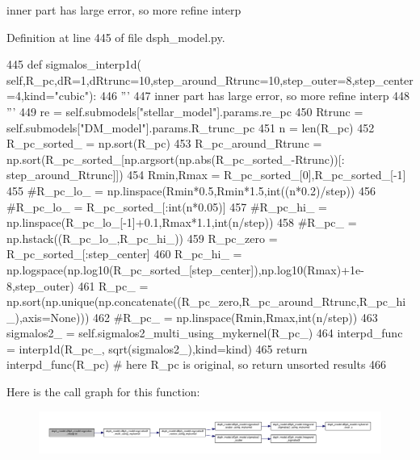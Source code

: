 \begin{DoxyVerb}inner part has large error, so more refine interp
\end{DoxyVerb}
 

Definition at line 445 of file dsph\+\_\+model.\+py.


\begin{DoxyCode}
445     \textcolor{keyword}{def }sigmalos\_interp1d(
      self,R\_pc,dR=1,dRtrunc=10,step\_around\_Rtrunc=10,step\_outer=8,step\_center=4,kind="cubic"):
446         \textcolor{stringliteral}{'''}
447 \textcolor{stringliteral}{        inner part has large error, so more refine interp}
448 \textcolor{stringliteral}{        '''}
449         re = self.submodels[\textcolor{stringliteral}{"stellar\_model"}].params.re\_pc
450         Rtrunc = self.submodels[\textcolor{stringliteral}{"DM\_model"}].params.R\_trunc\_pc
451         n = len(R\_pc)
452         R\_pc\_sorted\_ = np.sort(R\_pc)
453         R\_pc\_around\_Rtrunc = np.sort(R\_pc\_sorted\_[np.argsort(np.abs(R\_pc\_sorted\_-Rtrunc))[:
      step\_around\_Rtrunc]])
454         Rmin,Rmax = R\_pc\_sorted\_[0],R\_pc\_sorted\_[-1]
455         \textcolor{comment}{#R\_pc\_lo\_ = np.linspace(Rmin*0.5,Rmin*1.5,int((n*0.2)/step))}
456         \textcolor{comment}{#R\_pc\_lo\_ = R\_pc\_sorted\_[:int(n*0.05)]}
457         \textcolor{comment}{#R\_pc\_hi\_ = np.linspace(R\_pc\_lo\_[-1]+0.1,Rmax*1.1,int(n/step))}
458         \textcolor{comment}{#R\_pc\_ = np.hstack((R\_pc\_lo\_,R\_pc\_hi\_))}
459         R\_pc\_zero = R\_pc\_sorted\_[:step\_center]
460         R\_pc\_hi\_ = np.logspace(np.log10(R\_pc\_sorted\_[step\_center]),np.log10(Rmax)+1e-8,step\_outer)
461         R\_pc\_ = np.sort(np.unique(np.concatenate((R\_pc\_zero,R\_pc\_around\_Rtrunc,R\_pc\_hi\_),axis=\textcolor{keywordtype}{None})))
462         \textcolor{comment}{#R\_pc\_ = np.linspace(Rmin,Rmax,int(n/step))}
463         sigmalos2\_ = self.sigmalos2\_multi\_using\_mykernel(R\_pc\_)
464         interpd\_func = interp1d(R\_pc\_, sqrt(sigmalos2\_),kind=kind)
465         \textcolor{keywordflow}{return} interpd\_func(R\_pc) \textcolor{comment}{# here R\_pc is original, so return unsorted results}
466     
\end{DoxyCode}
Here is the call graph for this function\+:\nopagebreak
\begin{figure}[H]
\begin{center}
\leavevmode
\includegraphics[width=350pt]{d0/d25/classdsph__model_1_1dSph__model_ad105b90e1827d25804eb3d7a3ba96f28_cgraph}
\end{center}
\end{figure}
\mbox{\label{classdsph__model_1_1dSph__model_a239ec859750c30fe31b6c19e94cd2e33}} 
